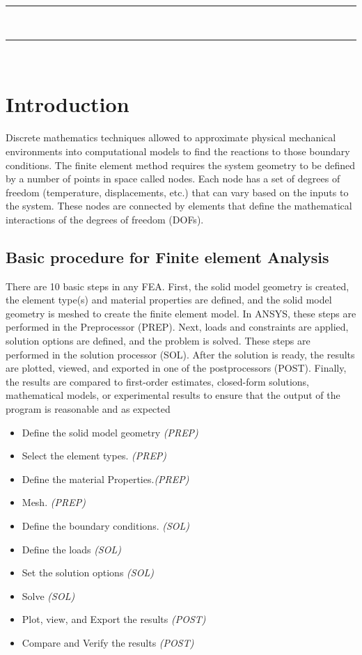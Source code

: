\documentclass[letterpaper,pdftex]{article}
\begin{document}
\noindent
\textcolor{gray}{\rule{\textwidth}{0.5pt}}\\
\renewcommand{\tablename}{Tabla}
\renewcommand{\arraystretch}{1.2}
\renewcommand\contentsname{Contenido}
\tableofcontents

\noindent
\textcolor{gray}{\rule{\textwidth}{0.5pt}}\\

\section{Introduction}

Discrete mathematics techniques allowed to approximate physical mechanical environments into computational models to find the reactions to those boundary conditions.  
The finite element method requires the system geometry to be defined by a number of points in space called nodes. Each node has a set of degrees of freedom (temperature, displacements, etc.) that can vary based on the inputs to the system. These nodes are connected by elements that define the mathematical interactions of the degrees of freedom (DOFs).

\subsection{Basic procedure for Finite element Analysis}

There are 10 basic steps in any FEA. First, the solid model geometry is created, the element type(s) and material properties are defined, and the solid model geometry is meshed to create the finite element model. In ANSYS, these steps are performed in the Preprocessor (PREP). Next, loads and constraints are applied, solution options are defined, and the problem is solved. These steps are performed in the solution processor (SOL). After the solution is ready, the results are plotted, viewed, and exported in one of the postprocessors (POST). Finally, the results are compared to first-order estimates, closed-form solutions, mathematical models, or experimental results to ensure that the output of the program is reasonable and as expected

\begin{itemize}
\item Define the solid model geometry \textit{(PREP)}
\item Select the element types. \textit{(PREP)}
\item Define the material Properties.\textit{(PREP)}
\item Mesh. \textit{(PREP)}
\item Define the boundary conditions. \textit{(SOL)}
\item Define the loads \textit{(SOL)}
\item Set the solution options \textit{(SOL)}
\item Solve \textit{(SOL)}
\item Plot, view, and Export the results \textit{(POST)}
\item Compare and Verify the results \textit{(POST)}

\end{itemize}
\end{document}
